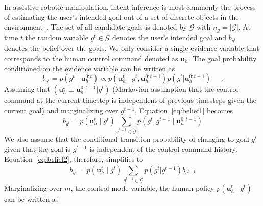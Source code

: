 \documentclass[letterpaper, 10 pt, conference]{ieeeconf}  %
\begin{document}
In assistive robotic manipulation, intent inference is most commonly the process of estimating the user's intended goal out of a set of discrete objects in the environment~\cite{calli2015ycb}. The set of all candidate goals is denoted by $\mathcal{G}$ with $n_g = \vert\mathcal{G}\vert$.
At time $t$ the random variable $g^t \in \mathcal{G}$ denotes the user's intended goal and $b_{g^t}$ denotes the belief over the goals. 
We only consider a single evidence variable that corresponds to the human control command denoted as $\boldsymbol{u}_h$. The goal probability conditioned on the evidence variable can be written as 
\begin{equation}\label{eq:belief1}
	b_{g^t} = p(g^t \;|\; \boldsymbol{u}_h^{0:t}) \propto p(\boldsymbol{u}_h^t\;|\;g^t,\boldsymbol{u}_h^{0:t-1})p(g^t|\boldsymbol{u}_h^{0:t-1}) \;\;\;\;\;.
\end{equation}
Assuming that $(\boldsymbol{u}_h^t \perp \boldsymbol{u}_h^{0:t-1} | g^t)$ (Markovian assumption that the control command at the current timestep is independent of previous timesteps given the current goal) and marginalizing over $g^{t-1}$, Equation~\ref{eq:belief1} becomes
\begin{equation}\label{eq:belief2}
	b_{g^t} = p(\boldsymbol{u}_h^t \;|\; g^t) \sum_{g^{t-1} \in \mathcal{G}}^{} p(g^t, g^{t-1} \; | \; \boldsymbol{u}_h^{0:t-1})
\end{equation}
We also assume that the conditional transition probability of changing to goal $g^t$ given that the goal is $g^{t-1}$ is independent of the control command history. Equation~\ref{eq:belief2}, therefore, simplifies to
\begin{equation}\label{eq:recursive_belief}
	b_{g^t} = p(\boldsymbol{u}_h^t \;|\; g^t) \sum_{g^{t-1} \in \mathcal{G}}^{} p(g^t | g^{t-1}) b_{g^{t-1}}
\end{equation}
Marginalizing over $m$, the control mode variable, the human policy $p(\boldsymbol{u}_h^t \;|\; g^t)$ can be written as 
\end{document}
